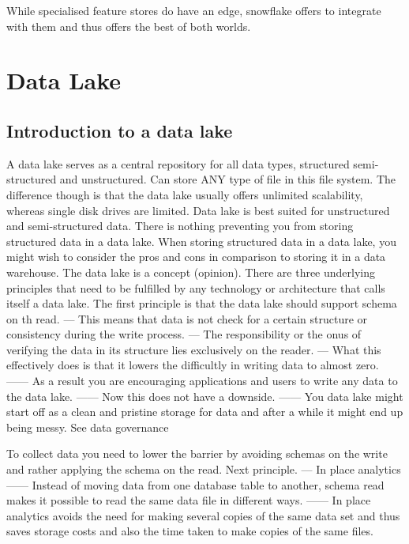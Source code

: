 \documentclass[a4paper, 11pt]{article}
\begin{document}
    While specialised feature stores do have an edge, snowflake offers to integrate with them and thus offers the best of both worlds.

    \section{Data Lake}

    \subsection{Introduction to a data lake}
    A data lake serves as a central repository for all data types, structured semi-structured and unstructured.
    Can store ANY type of file in this file system.
    The difference though is that the data lake usually offers unlimited scalability, whereas single disk drives are limited.
    Data lake is best suited for unstructured and semi-structured data.
    There is nothing preventing you from storing structured data in a data lake.
    When storing structured data in a data lake, you might wish to consider the pros and cons in comparison to storing it in a data warehouse.
    The data lake is a concept (opinion).
    There are three underlying principles that need to be fulfilled by any technology or architecture that calls itself a data lake.
    The first principle is that the data lake should support schema on th read.
    --- This means that data is not check for a certain structure or consistency during the write process.
    --- The responsibility or the onus of verifying the data in its structure lies exclusively on the reader.
    --- What this effectively does is that it lowers the difficultly in writing data to almost zero.
    ------ As a result you are encouraging applications and users to write any data to the data lake.
    ------ Now this does not have a downside.
    ------ You data lake might start off as a clean and pristine storage for data and after a while it might end up being messy. See data governance

    To collect data you need to lower the barrier by avoiding schemas on the write and rather applying the schema on the read.
    Next principle.
    --- In place analytics
    ------ Instead of moving data from one database table to another, schema read makes it possible to read the same data file in different ways.
    ------ In place analytics avoids the need for making several copies of the same data set and thus saves storage costs and also the time taken to make copies of the same files.
\end{document}
